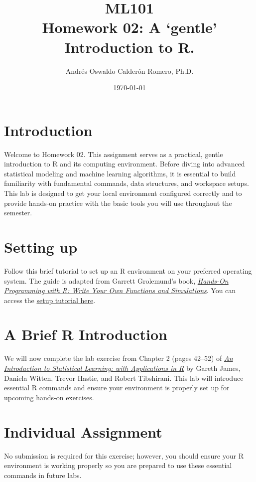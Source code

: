\documentclass{article}
\title{ML101 \\ Homework 02: A `gentle' Introduction to R.}
\author{Andrés Oswaldo Calderón Romero, Ph.D.}
\date{\today}
\begin{document}
\maketitle

\section{Introduction}
\label{sec:intro}

Welcome to Homework 02. This assignment serves as a practical, gentle introduction to R and its computing environment. Before diving into advanced statistical modeling and machine learning algorithms, it is essential to build familiarity with fundamental commands, data structures, and workspace setups. This lab is designed to get your local environment configured correctly and to provide hands-on practice with the basic tools you will use throughout the semester.

\section{Setting up}
\label{sec:setup}

Follow this brief tutorial to set up an R environment on your preferred operating system. The guide is adapted from Garrett Grolemund’s book, \href{https://rstudio-education.github.io/hopr/}{\textit{Hands-On Programming with R: Write Your Own Functions and Simulations}}. You can access the \href{https://rstudio-education.github.io/hopr/starting.html}{setup tutorial here}.

\section{A Brief R Introduction}
\label{sec:rinto}

We will now complete the lab exercise from Chapter 2 (pages 42–52) of \href{https://www.statlearning.com/}{\textit{An Introduction to Statistical Learning: with Applications in R}} by Gareth James, Daniela Witten, Trevor Hastie, and Robert Tibshirani. This lab will introduce essential R commands and ensure your environment is properly set up for upcoming hands-on exercises.

\section{Individual Assignment}
\label{sec:work}

No submission is required for this exercise; however, you should ensure your R environment is working properly so you are prepared to use these essential commands in future labs.
\end{document}

